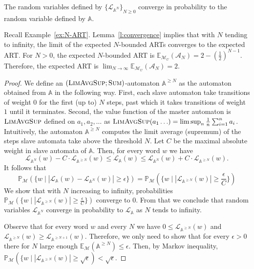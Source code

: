 \documentclass{lmcs}
\newcommand{\nestedA}{\mathbb{A}}
\newcommand{\lang}{\mathcal{L}}
\newcommand{\valueL}[1]{\mathcal{L}_{{#1}}}
\newcommand{\fsum}{\textsc{Sum}}
\newcommand{\aut}{\mathcal{A}}
\newcommand{\probability}{\mathbb{P}}
\newcommand{\expected}{\mathbb{E}}
\newcommand{\markov}{\mathcal{M}}
\begin{document}
\begin{lem}\label{l:convergence}
The random variables defined by ${\{ \lang_{\nestedA^N} \}}_{N\geq 0}$ converge in probability to
the random variable defined by $\nestedA$.
\end{lem}

\begin{exa}
Recall Example~\ref{ex:N-ART}.
Lemma~\ref{l:convergence} implies that with $N$ tending to infinity,
the limit of the expected $N$-bounded ARTs converges to the expected ART\@.
For $N>0$, the expected $N$-bounded ART is
$\expected_{\markov_U}(\aut_N) =  2 -  {(\frac{1}{2})}^{N-1}$.  Therefore, the expected ART is $\lim_{N \to \infty} \expected_{\markov_U}(\aut_N) = 2$.
\end{exa}

\begin{proof}
\newcommand{\excessA}[1]{\ensuremath{\nestedA^{\geq #1}}}
\newcommand{\partialExcessA}[1]{\nestedA[#1]}
\newcommand{\flimavgsup}{\textsc{LimAvgSup}}
We define an $(\flimavgsup; \fsum)$-automaton $\excessA{N}$ as the automaton obtained from $\nestedA$ in the following way.
First, each slave automaton take transitions of weight $0$ for the first (up to) $N$ steps, past which it takes transitions of weight $1$
until it terminates.
Second, the value function of the master automaton is $\flimavgsup$ defined on  $a_1, a_2, \ldots$ as
$\flimavgsup(a_1 \ldots ) = \limsup_n \frac{1}{n} \sum_{i=1}^{n} a_i$.
Intuitively, the automaton $\excessA{N}$ computes the limit average (supremum) of the steps slave automata take above the threshold $N$.
Let $C$ be the maximal absolute weight in slave automata of $\nestedA$. Then, for every word $w$ we have
\[
\valueL{\nestedA^N}(w) - C \cdot \valueL{\excessA{N}}(w) \leq \valueL{\nestedA}(w) \leq \valueL{\nestedA^N}(w) + C \cdot \valueL{\excessA{N}}(w).
\]
It follows that
\[
\probability_{\markov}(\{ w \mid |\valueL{\nestedA}(w) - \valueL{\nestedA^N}(w)| \geq \epsilon \}) =
\probability_{\markov}(\{ w \mid |\valueL{\excessA{N}}(w)| \geq \frac{\epsilon}{C} \})
\]
We show that with $N$ increasing to infinity,
probabilities $\probability_{\markov}(\{ w \mid |\valueL{\excessA{N}}(w)| \geq \frac{\epsilon}{C}\} )$
converge to $0$.
From that we conclude that
random variables $\lang_{\nestedA^N}$ converge in probability to $\lang_{\nestedA}$ as $N$ tends to infinity.

Observe that for every word $w$ and every $N$ we have  $0 \leq \valueL{\excessA{N}}(w)$ and $\valueL{\excessA{N}}(w) \geq \valueL{\excessA{N+1}}(w)$.
Therefore, we only need to show that
 for every $\epsilon > 0$ there for $N$ large enough $\expected_{\markov}(\excessA{N}) \leq \epsilon$. Then, by Markov inequality,
$\probability_{\markov}(\{ w \mid |\valueL{\excessA{N}}(w)| \geq \sqrt{\epsilon}) < \sqrt{\epsilon}$.


\end{proof}
\end{document}
